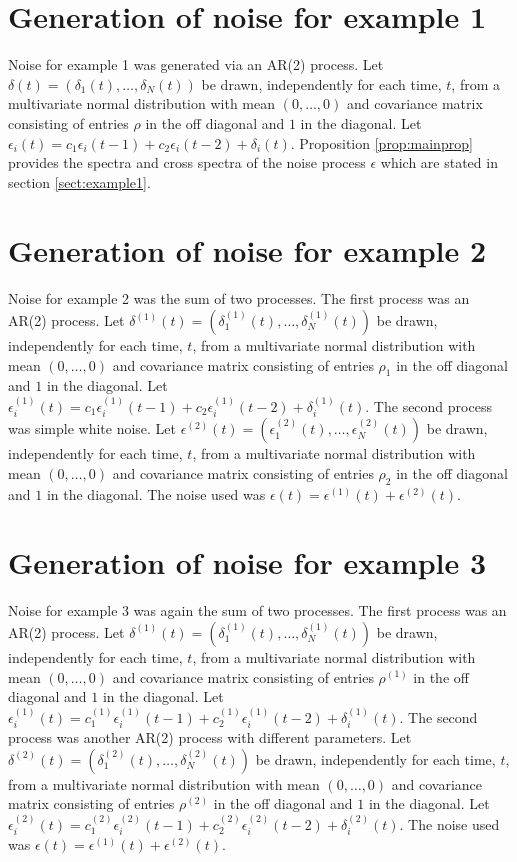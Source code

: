 \documentclass[letterpaper,11pt]{article}
\begin{document}
\section{Generation of noise for example 1}\label{sec:noise1}

Noise for example 1 was generated via an AR(2) process. Let 
$\delta(t) = (\delta_1(t),\ldots,\delta_N(t))$ be drawn, independently for 
each time, $t$, from a multivariate normal distribution with mean $(0,\ldots,0)$
and covariance matrix consisting of entries $\rho$ in the off diagonal and $1$
in the diagonal. Let $\epsilon_i(t)=c_1 \epsilon_i(t-1) + c_2 \epsilon_i(t-2)+\delta_i(t)$. Proposition \ref{prop:mainprop} provides the spectra
and cross spectra of the noise process $\epsilon$ which are stated in section
\ref{sect:example1}.

\section{Generation of noise for example 2}\label{sec:noise2}

Noise for example 2 was the sum of two processes. The first process was an 
AR(2) process. Let $\delta^{(1)}(t) = (\delta^{(1)}_1(t),\ldots,\delta^{(1)}_N(t))$ be drawn, independently for each time, $t$, from a multivariate normal distribution with mean $(0,\ldots,0)$
and covariance matrix consisting of entries $\rho_1$ in the off diagonal and $1$
in the diagonal. Let $\epsilon^{(1)}_i(t)=c_1 \epsilon^{(1)}_i(t-1) + c_2 \epsilon^{(1)}_i(t-2)+\delta^{(1)}_i(t)$. The second process was simple white noise.
Let $\epsilon^{(2)}(t) = (\epsilon^{(2)}_1(t),\ldots,\epsilon^{(2)}_N(t))$ be drawn, independently for each time, $t$, from a multivariate normal distribution with mean $(0,\ldots,0)$
and covariance matrix consisting of entries $\rho_2$ in the off diagonal and $1$
in the diagonal. The noise used was $\epsilon(t)=\epsilon^{(1)}(t)+\epsilon^{(2)}(t)$.

\section{Generation of noise for example 3}\label{sec:noise3}

Noise for example 3 was again the sum of two processes. 
The first process was an
AR(2) process. Let $\delta^{(1)}(t) = (\delta^{(1)}_1(t),\ldots,\delta^{(1)}_N(t))$ be drawn, independently for each time, $t$, from a multivariate normal distribution with mean $(0,\ldots,0)$
and covariance matrix consisting of entries $\rho^{(1)}$ in the off diagonal and $1$
in the diagonal. Let $\epsilon^{(1)}_i(t)=c_1^{(1)} \epsilon^{(1)}_i(t-1) + c_2^{(1)} \epsilon^{(1)}_i(t-2)+\delta^{(1)}_i(t)$. The second process was
another AR(2) process with different parameters. 
Let $\delta^{(2)}(t) = (\delta^{(2)}_1(t),\ldots,\delta^{(2)}_N(t))$ be drawn, independently for each time, $t$, from a multivariate normal distribution with mean $(0,\ldots,0)$
and covariance matrix consisting of entries $\rho^{(2)}$ in the off diagonal and $1$
in the diagonal. Let $\epsilon^{(2)}_i(t)=c_1^{(2)} \epsilon^{(2)}_i(t-1) + c_2^{(2)} \epsilon^{(2)}_i(t-2)+\delta^{(2)}_i(t)$.
The noise used was $\epsilon(t)=\epsilon^{(1)}(t)+\epsilon^{(2)}(t)$.



\end{document}
